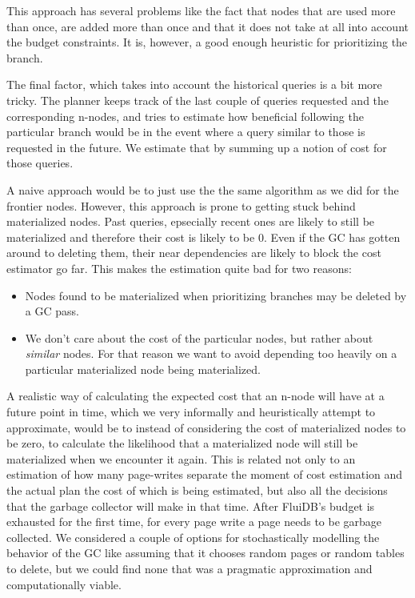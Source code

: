 This approach has several problems like the fact that nodes that are
used more than once, are added more than once and that it does not take
at all into account the budget constraints. It is, however, a good
enough heuristic for prioritizing the branch.

The final factor, which takes into account the historical queries is a
bit more tricky. The planner keeps track of the last couple of queries
requested and the corresponding n-nodes, and tries to estimate how
beneficial following the particular branch would be in the event where
a query similar to those is requested in the future. We estimate that
by summing up a notion of cost for those queries.

A naive approach would be to just use the the same algorithm as we did
for the frontier nodes. However, this approach is prone to getting
stuck behind materialized nodes. Past queries, epsecially recent ones
are likely to still be materialized and therefore their cost is likely
to be 0. Even if the GC has gotten around to deleting them, their near
dependencies are likely to block the cost estimator go far. This makes
the estimation quite bad for two reasons:

\begin{itemize}
\item Nodes found to be materialized when prioritizing branches may be
  deleted by a GC pass.
\item We don't care about the cost of the particular nodes, but rather
  about \emph{similar} nodes. For that reason we want to avoid
  depending too heavily on a particular materialized node being
  materialized.
\end{itemize}

A realistic way of calculating the expected cost that an n-node will
have at a future point in time, which we very informally and
heuristically attempt to approximate, would be to instead of
considering the cost of materialized nodes to be zero, to calculate
the likelihood that a materialized node will still be materialized
when we encounter it again. This is related not only to an estimation
of how many page-writes separate the moment of cost estimation and the
actual plan the cost of which is being estimated, but also all the
decisions that the garbage collector will make in that time. After
FluiDB's budget is exhausted for the first time, for every page write
a page needs to be garbage collected. We considered a couple of
options for stochastically modelling the behavior of the GC like
assuming that it chooses random pages or random tables to delete, but
we could find none that was a pragmatic approximation and
computationally viable.

